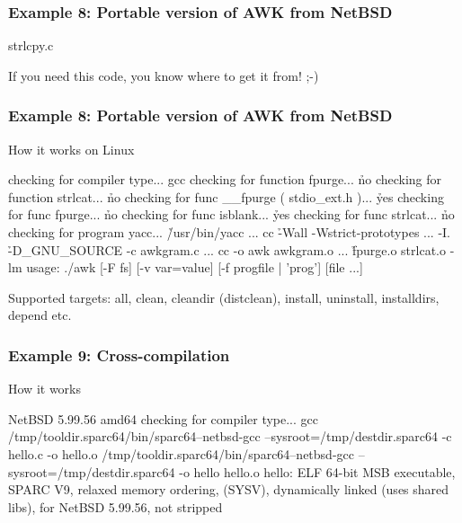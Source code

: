 \documentclass[hyperref={colorlinks=true}]{beamer}
\begin{document}
\begin{frame}[fragile]
  \frametitle{Example 8: Portable version of AWK from NetBSD}

\begin{block}{strlcpy.c}
\begin{CodeNoLabel}
If you need this code, you know where to get it from! ;-)
\end{CodeNoLabel}
\end{block}
\end{frame}

\begin{frame}[fragile]
  \frametitle{Example 8: Portable version of AWK from NetBSD}

\begin{block}{How it works on Linux}
\begin{CodeNoLabel}
checking for compiler type... gcc
checking for function fpurge... \h{no}
checking for function strlcat... \h{no}
checking for func __fpurge ( stdio_ext.h )... \h{yes}
checking for func fpurge... \h{no}
checking for func isblank... \h{yes}
checking for func strlcat... \h{no}
checking for program yacc... \h{/usr/bin/yacc}
...
cc \h{-Wall -Wstrict-prototypes ...} 
    -I. \h{-D\_GNU\_SOURCE} -c awkgram.c
...
cc -o awk awkgram.o ... \h{fpurge.o strlcat.o} -lm
usage: ./awk [-F fs] [-v var=value] [-f progfile 
    | 'prog'] [file ...]
\prompt{\$}
\end{CodeNoLabel}
\end{block}
Supported targets: all, clean, cleandir (distclean), install,
uninstall, installdirs, depend etc.
\end{frame}

\begin{frame}[fragile]
  \frametitle{Example 9: Cross-compilation}

\begin{block}{How it works}
\begin{CodeNoLabel}
NetBSD 5.99.56 amd64
checking for compiler type... gcc
/tmp/tooldir.sparc64/bin/sparc64--netbsd-gcc
   --sysroot=/tmp/destdir.sparc64 -c hello.c -o hello.o
/tmp/tooldir.sparc64/bin/sparc64--netbsd-gcc
   --sysroot=/tmp/destdir.sparc64 -o hello hello.o
hello: ELF 64-bit MSB executable, SPARC V9, relaxed
   memory ordering, (SYSV), dynamically linked (uses
   shared libs), for NetBSD 5.99.56, not stripped
\prompt{\$ }
\end{CodeNoLabel}
\end{block}
\end{frame}
\end{document}
